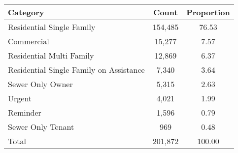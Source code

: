 \begin{tabular}{l|c|c}
\toprule 
\midrule 
Category & Count & Proportion \\
\midrule 
Residential Single Family & 154,485 & 76.53 \\
Commercial & 15,277 & 7.57 \\
Residential Multi Family & 12,869 & 6.37 \\
Residential Single Family on Assistance & 7,340 & 3.64 \\
Sewer Only Owner & 5,315 & 2.63 \\
Urgent & 4,021 & 1.99 \\
Reminder & 1,596 & 0.79 \\
Sewer Only Tenant & 969 & 0.48 \\
\midrule 
Total & 201,872 & 100.00 \\
\midrule 
\bottomrule 
\end{tabular}
